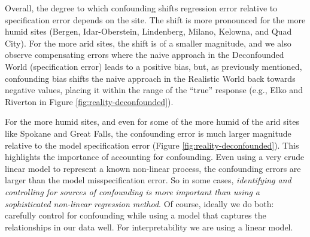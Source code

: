 Overall, the degree to which confounding shifts regression error
relative to specification error depends on the site. The shift is more
pronounced for the more humid sites (Bergen, Idar-Oberstein,
Lindenberg, Milano, Kelowna, and Quad City). For the more arid sites,
the shift is of a smaller magnitude, and we also observe compensating
errors where the naive approach in the Deconfounded World
(specification error) leads to a positive bias, but, as previously
mentioned, confounding bias shifts the naive approach in the Realistic
World back towards negative values, placing it within the range of the
``true'' response (e.g., Elko and Riverton in Figure
\ref{fig:reality-deconfounded}).

For the more humid sites, and even for some of the more humid of the
arid sites like Spokane and Great Falls, the confounding error is much
larger magnitude relative to the model specification error (Figure
\ref{fig:reality-deconfounded}). This highlights the importance of
accounting for confounding. Even using a very crude linear model to
represent a known non-linear process, the confounding errors are
larger than the model misspecification error. So in some cases,
\textit{identifying and controlling for sources of confounding is more
  important than using a sophisticated non-linear regression
  method}. Of course, ideally we do both: carefully control for
confounding while using a model that captures the relationships in our
data well. For interpretability we are using a linear model.

